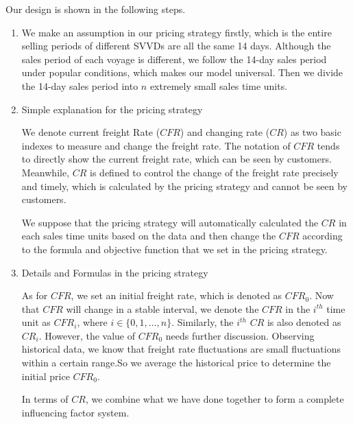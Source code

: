 Our design is shown in the following steps.
\begin{enumerate}[\quad\bf1.]
\item We make an assumption in our pricing strategy firstly, which is the entire selling periods of different SVVDs are all the same 14 days. Although the sales period of each voyage is different, we follow the 14-day sales period under popular conditions, which makes our model universal. Then we divide the 14-day sales period into $n$ extremely small sales time units.

\item Simple explanation for the pricing strategy

\hspace{1em}
We denote current freight Rate ($CFR$) and changing rate ($CR$) as two basic indexes to measure and change the freight rate. The notation of $CFR$ tends to directly show the current freight rate, which can be seen by customers. Meanwhile, $CR$ is defined to control the change of the freight rate precisely and timely, which is calculated by the pricing strategy and cannot be seen by customers.

\hspace{1em}
We suppose that the pricing strategy will automatically calculated the $CR$ in each sales time units based on the data and then change the $CFR$ according to the formula and objective function that we set in the pricing strategy.

\item Details and Formulas in the pricing strategy

\hspace{1em}
As for $CFR$, we set an initial freight rate, which is denoted as $CFR_0$. Now that $CFR$ will change in a stable interval, we denote the $CFR$ in the $i^{th}$ time unit  as $CFR_i$, where $i\in\{0,1,\dots,n \}$. Similarly, the $i^{th}$ $CR$ is also denoted as $CR_i$. However, the value of $CFR_0$ needs further discussion. Observing historical data, we know that freight rate fluctuations are small fluctuations within a certain range.So we average the historical price to determine the initial price $CFR_0$.

\hspace{1em}
In terms of $CR$, we combine what we have done together to form a complete influencing factor system.


\end{enumerate}
